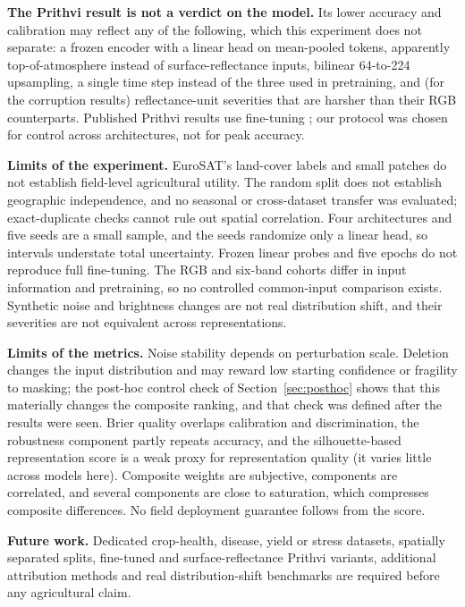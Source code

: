 \documentclass[3p,times,procedia]{elsarticle}
\begin{document}
\textbf{The Prithvi result is not a verdict on the model.} Its lower accuracy and calibration may reflect any of the following, which this experiment does not separate: a frozen encoder with a linear head on mean-pooled tokens, apparently top-of-atmosphere instead of surface-reflectance inputs, bilinear 64-to-224 upsampling, a single time step instead of the three used in pretraining, and (for the corruption results) reflectance-unit severities that are harsher than their RGB counterparts. Published Prithvi results use fine-tuning \cite{prithvi,prithvicard}; our protocol was chosen for control across architectures, not for peak accuracy.

\textbf{Limits of the experiment.} EuroSAT's land-cover labels and small patches do not establish field-level agricultural utility. The random split does not establish geographic independence, and no seasonal or cross-dataset transfer was evaluated; exact-duplicate checks cannot rule out spatial correlation. Four architectures and five seeds are a small sample, and the seeds randomize only a linear head, so intervals understate total uncertainty. Frozen linear probes and five epochs do not reproduce full fine-tuning. The RGB and six-band cohorts differ in input information and pretraining, so no controlled common-input comparison exists. Synthetic noise and brightness changes are not real distribution shift, and their severities are not equivalent across representations.

\textbf{Limits of the metrics.} Noise stability depends on perturbation scale. Deletion changes the input distribution and may reward low starting confidence or fragility to masking; the post-hoc control check of Section~\ref{sec:posthoc} shows that this materially changes the composite ranking, and that check was defined after the results were seen. Brier quality overlaps calibration and discrimination, the robustness component partly repeats accuracy, and the silhouette-based representation score is a weak proxy for representation quality (it varies little across models here). Composite weights are subjective, components are correlated, and several components are close to saturation, which compresses composite differences. No field deployment guarantee follows from the score.

\textbf{Future work.} Dedicated crop-health, disease, yield or stress datasets, spatially separated splits, fine-tuned and surface-reflectance Prithvi variants, additional attribution methods and real distribution-shift benchmarks are required before any agricultural claim.
\end{document}
